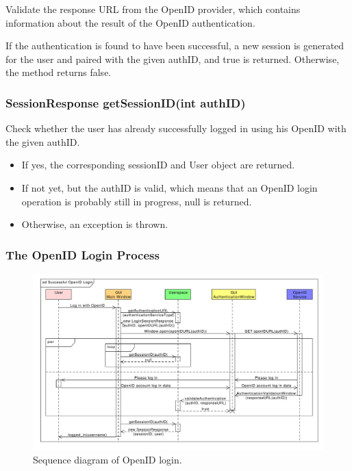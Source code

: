 Validate the response URL from the OpenID provider, which contains information about the result of the OpenID authentication.

If the authentication is found to have been successful, a new session is generated for the user and paired with the given authID, and true is returned.
Otherwise, the method returns false.

\subsubsection{SessionResponse getSessionID(int authID)}

Check whether the user has already successfully logged in using his OpenID with the given authID.

\begin{itemize}
\item If yes, the corresponding sessionID and User object are returned.
\item If not yet, but the authID is valid, which means that an OpenID login operation is probably still in progress, null is returned.
\item Otherwise, an exception is thrown.
\end{itemize}

\subsubsection{The OpenID Login Process}
\label{subsubsec:gui:openid}

\begin{figure}[h]
\begin{center}
\includegraphics[scale=0.55, angle=90]{figures/openid_login_sequence.pdf}
\end{center}
\caption{Sequence diagram of OpenID login.}\label{rpc:sd:openid_login}
\end{figure}

